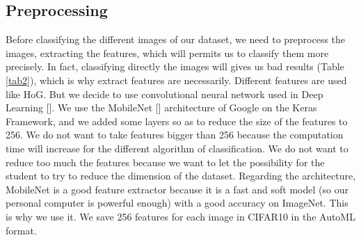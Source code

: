 \documentclass[10pt, a4paper, twocolumn]{article} %
\begin{document}
\subsection{Preprocessing}
Before classifying the different images of our dataset, we need to preprocess the images, extracting the features, which will permits us to classify them more precisely. In fact, classifying directly the images will gives us bad results (Table \ref{tab2}), which is why extract features are necessarily.  Different features are used like HoG. But we decide to use convolutional neural network used in Deep Learning [\cite{2}].  We use the MobileNet [\cite{3}] architecture of Google on the Keras Framework, and we added some layers so as to reduce the size of the features to 256. We do not want to take features bigger than 256 because the computation time will increase for the different algorithm of classification. We do not want to reduce too much the features because we want to let the possibility for the student to try to reduce the dimension of the dataset.  Regarding the architecture, MobileNet is a good feature extractor because it is a fast and soft model (so our personal computer is powerful enough) with a good accuracy on ImageNet. This is why we use it. We save 256 features for each image in CIFAR10 in the AutoML format. 
\end{document}
